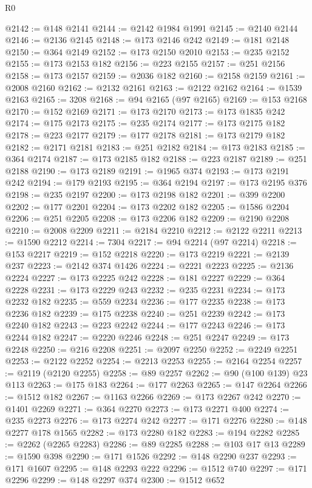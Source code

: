 \begin{lexlean}{R0}
\begin{coremodule}
@2142 := @148 @2141
@2144 := @2142 @1984 @1991
@2145 := @2140 @2144
@2146 := @2136 @2145
@2148 := @173 @2146 @242
@2149 := @181 @2148
@2150 := @364 @2149
@2152 := @173 @2150 @2010
@2153 := @235 @2152
@2155 := @173 @2153 @182
@2156 := @223 @2155
@2157 := @251 @2156
@2158 := @173 @2157
@2159 := @2036 @182
@2160 := @2158 @2159
@2161 := @2008 @2160
@2162 := @2132 @2161
@2163 := @2122 @2162
@2164 := @1539 @2163
@2165 := 3208
@2168 := @94 @2165 (@97 @2165)
@2169 := @153 @2168
@2170 := @152 @2169
@2171 := @173 @2170
@2173 := @173 @1835 @242
@2174 := @175 @2173
@2175 := @235 @2174
@2177 := @173 @2175 @182
@2178 := @223 @2177
@2179 := @177 @2178
@2181 := @173 @2179 @182
@2182 := @2171 @2181
@2183 := @251 @2182
@2184 := @173 @2183
@2185 := @364 @2174
@2187 := @173 @2185 @182
@2188 := @223 @2187
@2189 := @251 @2188
@2190 := @173 @2189
@2191 := @1965 @374
@2193 := @173 @2191 @242
@2194 := @179 @2193
@2195 := @364 @2194
@2197 := @173 @2195 @376
@2198 := @235 @2197
@2200 := @173 @2198 @182
@2201 := @399 @2200
@2202 := @177 @2201
@2204 := @173 @2202 @182
@2205 := @1586 @2204
@2206 := @251 @2205
@2208 := @173 @2206 @182
@2209 := @2190 @2208
@2210 := @2008 @2209
@2211 := @2184 @2210
@2212 := @2122 @2211
@2213 := @1590 @2212
@2214 := 7304
@2217 := @94 @2214 (@97 @2214)
@2218 := @153 @2217
@2219 := @152 @2218
@2220 := @173 @2219
@2221 := @2139 @237
@2223 := @2142 @374 @1426
@2224 := @2221 @2223
@2225 := @2136 @2224
@2227 := @173 @2225 @242
@2228 := @181 @2227
@2229 := @364 @2228
@2231 := @173 @2229 @243
@2232 := @235 @2231
@2234 := @173 @2232 @182
@2235 := @559 @2234
@2236 := @177 @2235
@2238 := @173 @2236 @182
@2239 := @175 @2238
@2240 := @251 @2239
@2242 := @173 @2240 @182
@2243 := @223 @2242
@2244 := @177 @2243
@2246 := @173 @2244 @182
@2247 := @2220 @2246
@2248 := @251 @2247
@2249 := @173 @2248
@2250 := @216 @2208
@2251 := @2097 @2250
@2252 := @2249 @2251
@2253 := @2122 @2252
@2254 := @2213 @2253
@2255 := @2164 @2254
@2257 := @2119 (@2120 @2255)
@2258 := @89 @2257
@2262 := @90 (@100 @139) @23 @113
@2263 := @175 @183
@2264 := @177 @2263
@2265 := @147 @2264
@2266 := @1512 @182
@2267 := @1163 @2266
@2269 := @173 @2267 @242
@2270 := @1401 @2269
@2271 := @364 @2270
@2273 := @173 @2271 @400
@2274 := @235 @2273
@2276 := @173 @2274 @242
@2277 := @171 @2276
@2280 := @148 @2277 @178 @1565
@2282 := @173 @2280 @182
@2283 := @194 @2282
@2285 := @2262 (@2265 @2283)
@2286 := @89 @2285
@2288 := @103 @17 @13
@2289 := @1590 @398
@2290 := @171 @1526
@2292 := @148 @2290 @237
@2293 := @171 @1607
@2295 := @148 @2293 @222
@2296 := @1512 @740
@2297 := @171 @2296
@2299 := @148 @2297 @374
@2300 := @1512 @652

\end{coremodule}
\end{lexlean}
